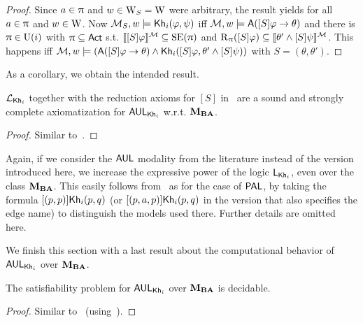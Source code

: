 \begin{proof}
	Since $a \in \uppi$ and $w \in \operatorname{W}_{{S}} = \operatorname{W}$ were arbitrary, the result yields for all $a \in \uppi$ and $w \in \operatorname{W}$.
	Now $\mathcal{M}_{{S}},w \models {\sf Kh}_i(\varphi,\psi)$ iff $\mathcal{M},w \models {\sf A}([S]\varphi \rightarrow \theta)$ and there is $\uppi \in \operatorname{U}(i)$ with $\uppi \subseteq {\rm \sf Act}$ s.t. $\llbracket [S]\varphi \rrbracket^{\mathcal{M}} \subseteq \operatorname{SE}(\uppi)$ and $\operatorname{R}_\uppi([S]\varphi) \subseteq \llbracket \theta' \wedge [S]\psi \rrbracket^{\mathcal{M}}$.
	This happens iff $\mathcal{M},w \models ({\sf A}([S]\varphi \rightarrow \theta) \wedge {\sf Kh}_i([S]\varphi,\theta' \wedge [S]\psi))$ with $S= (\theta,\theta')$.
\end{proof}

As a corollary, we obtain the intended result.

\medskip 

\begin{theorem}\label{th:aulcomplete}
$\mathcal{L}_{{\sf Kh}_i}$ together with the reduction axioms for $[S]$ in~ are a sound and strongly complete axiomatization for $\mathsf{AUL}_{{\sf Kh}_i}$ w.r.t. $\mathbf{M}_{\mathbf{BA}}$.
\end{theorem}

\begin{proof}
Similar to~.
\end{proof}

Again, if we consider the $\mathsf{AUL}$ modality from the literature instead of the version introduced here, we increase the expressive power of the logic $\mathsf{L}_{{\sf Kh}_i}$, even over the class $\mathbf{M}_{\mathbf{BA}}$. This easily follows from~ as for the case of $\textsf{PAL}$, by taking the formula $[(p,p)]{\sf Kh}_i(p,q)$ (or $[(p,a,p)]{\sf Kh}_i(p,q)$ in the version that also specifies the edge name) to distinguish the models used there. Further details are omitted here. 


\smallskip

We finish this section with a last result about the computational behavior of $\mathsf{AUL}_{{\sf Kh}_i}$ over $\mathbf{M}_{\mathbf{BA}}$.

\medskip 

\begin{corollary}\label{cor:aulsat}
The satisfiability problem for $\mathsf{AUL}_{{\sf Kh}_i}$ over $\mathbf{M}_{\mathbf{BA}}$ is decidable.
\end{corollary}
\begin{proof}
Similar to~ (using~).
\end{proof}
